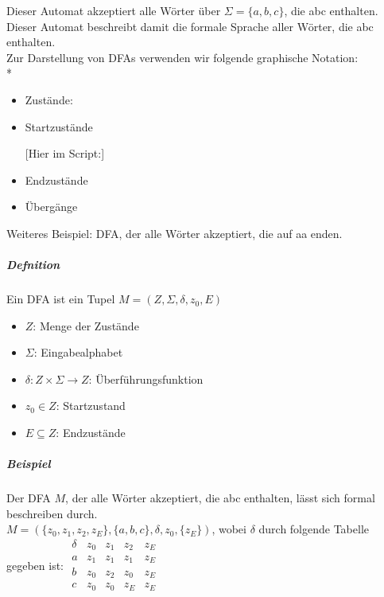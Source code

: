 \documentclass[a4paper]{scrartcl}
\begin{document}
Dieser Automat akzeptiert alle Wörter über $\Sigma = \{a,b,c\}$, die abc enthalten. Dieser Automat beschreibt damit die formale Sprache aller Wörter, die abc enthalten.\\
Zur Darstellung von DFAs verwenden wir folgende graphische Notation:\\*
\begin{itemize}
\item Zustände: 
\item Startzustände  [Hier im Script:] 
\item Endzustände 
\item Übergänge 
\end{itemize}
Weiteres Beispiel: DFA, der alle Wörter akzeptiert, die auf aa enden.

\subparagraph{Defnition} Ein DFA ist ein Tupel $M=(Z,\Sigma,\delta,z_0,E)$
\begin{itemize}
\item $Z$: Menge der Zustände
\item $\Sigma$: Eingabealphabet
\item $\delta: Z \times \Sigma \to Z$: Überführungsfunktion
\item $z_0 \in Z$: Startzustand
\item $E \subseteq Z$: Endzustände
\end{itemize}

\subparagraph{Beispiel} Der DFA $M$, der alle Wörter akzeptiert, die abc enthalten, lässt sich formal beschreiben durch.\\
$M=(\{z_0,z_1,z_2,z_E\},\{a,b,c\},\delta,z_0,\{z_E\})$, wobei $\delta$ durch folgende Tabelle gegeben ist:
$\begin{array}{c|cccc}
\delta & z_0 & z_1 & z_2 & z_E\\ \hline
a & z_1 & z_1 & z_1 & z_E\\
b & z_0 & z_2 & z_0 & z_E\\
c & z_0 & z_0 & z_E & z_E\\
\end{array}$
\end{document}
